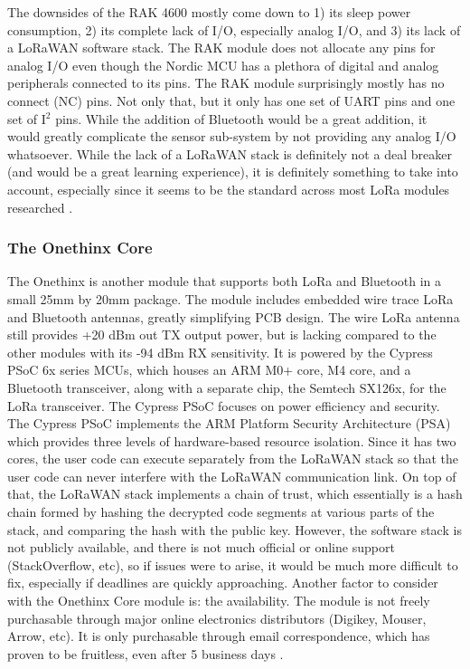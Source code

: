 The downsides of the RAK 4600 mostly come down to 1) its sleep power
consumption, 2) its complete lack of I/O, especially analog I/O, and 3) its lack
of a LoRaWAN software stack. The RAK module does not allocate any pins for
analog I/O even though the Nordic MCU has a plethora of digital and analog
peripherals connected to its pins. The RAK module surprisingly mostly has no
connect (NC) pins. Not only that, but it only has one set of UART pins and one
set of I$^2$ pins. While the addition of Bluetooth would be a great addition, it
would greatly complicate the sensor sub-system by not providing any analog I/O
whatsoever. While the lack of a LoRaWAN stack is definitely not a deal breaker
(and would be a great learning experience), it is definitely something to take
into account, especially since it seems to be the standard across most LoRa
modules researched \cite{ds-rak4600}.

\subsubsection{The Onethinx Core}
The Onethinx is another module that supports both LoRa and Bluetooth in a small
25mm by 20mm package. The module includes embedded wire trace LoRa and Bluetooth
antennas, greatly simplifying PCB design. The wire LoRa antenna still provides
+20 dBm out TX output power, but is lacking compared to the other modules with
its -94 dBm RX sensitivity. It is powered by the Cypress PSoC 6x series MCUs,
which houses an ARM M0+ core, M4 core, and a Bluetooth transceiver, along with a
separate chip, the Semtech SX126x, for the LoRa transceiver. The Cypress PSoC
focuses on power efficiency and security. The Cypress PSoC implements the ARM
Platform Security Architecture (PSA) which provides three levels of
hardware-based resource isolation. Since it has two cores, the user code can
execute separately from the LoRaWAN stack so that the user code can never
interfere with the LoRaWAN communication link. On top of that, the LoRaWAN stack
implements a chain of trust, which essentially is a hash chain formed by hashing
the decrypted code segments at various parts of the stack, and comparing the
hash with the public key. However, the software stack is not publicly available,
and there is not much official or online support (StackOverflow, etc), so if
issues were to arise, it would be much more difficult to fix, especially if
deadlines are quickly approaching. Another factor to consider with the Onethinx
Core module is: the availability. The module is not freely purchasable through
major online electronics distributors (Digikey, Mouser, Arrow, etc). It is only
purchasable through email correspondence, which has proven to be fruitless, even
after 5 business days \cite{ds-onethinx}\cite{ds-sx1261}\cite{ds-psoc64bl}.

